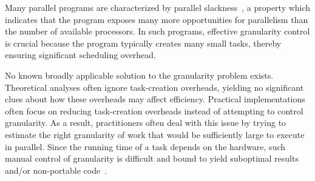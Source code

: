 
Many parallel programs are characterized by parallel
slackness~\cite{Valiant90}, a property which indicates that the
program exposes many more opportunities for parallelism than the
number of available processors. In such programs, effective
granularity control is crucial because the program typically creates
many small tasks, thereby ensuring significant scheduling overhead.


No known broadly applicable solution to the granularity problem
exists. Theoretical analyses often ignore task-creation overheads,
yielding no significant clues about how these overheads may affect
efficiency.  Practical implementations often focus on reducing
task-creation overheads instead of attempting to control granularity.
As a result, practitioners often deal with this issue by trying to
estimate the right granularity of work that would be sufficiently
large to execute in parallel.  
%
Since the running time of a task depends on the hardware, such manual
control of granularity is difficult
and bound to yield suboptimal results and/or non-portable
code~\cite{lazy-binary-splitting}.



